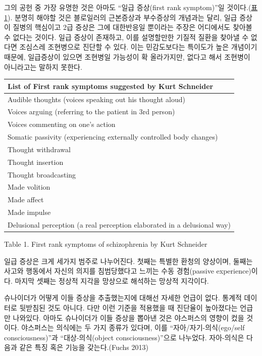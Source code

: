 \documentclass[
]{article}
\begin{document}
그의 공헌 중 가장 유명한 것은 아마도 ``일급 증상(first rank symptom)''일
것이다.(\protect\hyperlink{tab:first-rank}{표 1}). 분명히 해야할 것은
블로일러의 근본증상과 부수증상의 개념과는 달리, 일급 증상이 질병의
핵심이고 2급 증상은 그에 대한반응일 뿐이라는 주장은 어디에서도 찾아볼 수
없다는 것이다. 일급 증상이 존재하고, 이를 설명할만한 기질적 질환을
찾아낼 수 없다면 조심스레 조현병으로 진단할 수 있다. 이는 민감도보다는
특이도가 높은 개념이기 때문에, 일급증상이 있으면 조현병일 가능성이 확
올라가지만, 없다고 해서 조현병이 아니라고는 말하지 못한다.

\hypertarget{tab:first-rank}{}
\begin{longtable}[]{@{}l@{}}
\toprule
List of First rank symptoms suggested by Kurt Schneider \\
\midrule
\endhead
Audible thoughts (voices speaking out his thought aloud) \\
Voices arguing (referring to the patient in 3rd person) \\
Voices commenting on one's action \\
Somatic passivity (experiencing externally controlled body changes) \\
Thought withdrawal \\
Thought insertion \\
Thought broadcasting \\
Made volition \\
Made affect \\
Made impulse \\
Delusional perception (a real perception elaborated in a delusional
way) \\
\bottomrule
\end{longtable}

Table 1. First rank symptoms of schizophrenia by Kurt Schneider

일급 증상은 크게 세가지 범주로 나누어진다. 첫째는 특별한 환청의
양상이며, 둘째는 사고와 행동에서 자신의 의지를 침범당했다고 느끼는 수동
경험(passive experience)이다. 마지막 셋째는 정상적 지각을 망상으로
해석하는 망상적 지각이다.

슈나이더가 어떻게 이들 증상을 추출했는지에 대해선 자세한 언급이 없다.
통계적 데이터로 뒷받침된 것도 아니다. 다만 이런 기준을 적용했을 때
진단율이 높아졌다는 언급만 나와있다. 아마도 슈나이더가 이들 증상을
뽑아낸 것은 야스퍼스의 영향이 컸을 것이다. 야스퍼스는 의식에는 두 가지
종류가 있다며, 이를 ``자아/자기-의식(ego/self consciousness)''과
``대상-의식(object consciousness)''으로 나누었다. 자아-의식은 다음과
같은 특징 혹은 기능을 갖는다.(Fuchs 2013)
\end{document}
